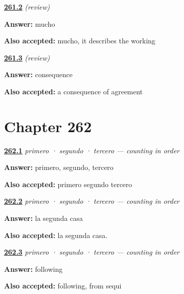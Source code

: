 \noindent\begin{minipage}[t]{\linewidth}
\raggedright
\hyperlink{review-ES-C66-repaso-lo-implicito-quant}{\textbf{261.2}} \emph{(review)}\par
\small \textbf{Answer:} mucho\par
\footnotesize \textbf{Also accepted:} mucho, it describes the working
\end{minipage}\par\medskip

\noindent\begin{minipage}[t]{\linewidth}
\raggedright
\hyperlink{review-ES-C66-repaso-lo-implicito-drop}{\textbf{261.3}} \emph{(review)}\par
\small \textbf{Answer:} consequence\par
\footnotesize \textbf{Also accepted:} a consequence of agreement
\end{minipage}\par\medskip

\section*{Chapter 262}

\noindent\begin{minipage}[t]{\linewidth}
\raggedright
\hyperlink{review-ES-C67-primero-count}{\textbf{262.1}} \emph{primero · segundo · tercero — counting in order}\par
\small \textbf{Answer:} primero, segundo, tercero\par
\footnotesize \textbf{Also accepted:} primero segundo tercero
\end{minipage}\par\medskip

\noindent\begin{minipage}[t]{\linewidth}
\raggedright
\hyperlink{review-ES-C67-primero-fem}{\textbf{262.2}} \emph{primero · segundo · tercero — counting in order}\par
\small \textbf{Answer:} la segunda casa\par
\footnotesize \textbf{Also accepted:} la segunda casa.
\end{minipage}\par\medskip

\noindent\begin{minipage}[t]{\linewidth}
\raggedright
\hyperlink{review-ES-C67-primero-second}{\textbf{262.3}} \emph{primero · segundo · tercero — counting in order}\par
\small \textbf{Answer:} following\par
\footnotesize \textbf{Also accepted:} following, from sequi
\end{minipage}\par\medskip

